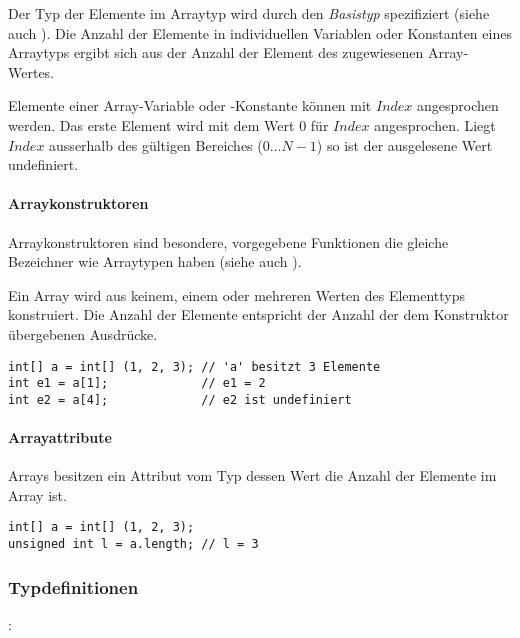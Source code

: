 Der Typ der Elemente im Arraytyp wird durch den \emph{Basistyp} spezifiziert (siehe auch ).
Die Anzahl der Elemente in individuellen Variablen oder Konstanten eines Arraytyps
ergibt sich aus der Anzahl der Element des zugewiesenen Array-Wertes.

Elemente einer Array-Variable oder -Konstante können mit \ident{Bezeichner[}$\mathit{Index}$\ident{]} angesprochen
werden. Das erste Element wird mit dem Wert $0$ für $\mathit{Index}$ angesprochen.
Liegt $\mathit{Index}$ ausserhalb des gültigen Bereiches ($0\dots{}N-1$) so ist der ausgelesene Wert
undefiniert.



\paragraph{Arraykonstruktoren}\label{Arraykonstruktoren}


Arraykonstruktoren sind besondere, vorgegebene Funktionen die gleiche Bezeichner wie Arraytypen haben
(siehe auch ).

Ein Array wird aus keinem, einem oder mehreren Werten des Elementtyps konstruiert.
Die Anzahl der Elemente entspricht der Anzahl der dem Konstruktor übergebenen Ausdrücke.

\begin{lstlisting}
int[] a = int[] (1, 2, 3); // 'a' besitzt 3 Elemente
int e1 = a[1];             // e1 = 2
int e2 = a[4];             // e2 ist undefiniert
\end{lstlisting}

\paragraph{Arrayattribute}\label{Arrayattribute}

Arrays besitzen ein Attribut  vom Typ  dessen Wert
die Anzahl der Elemente im Array ist.

\begin{lstlisting}
int[] a = int[] (1, 2, 3);
unsigned int l = a.length; // l = 3
\end{lstlisting}

\subsubsection{Typdefinitionen}\label{Typdefinitionen}
:\label{typ_definition}\\
\hspace*{1cm}\Gspace{} \Gspace{}\\

